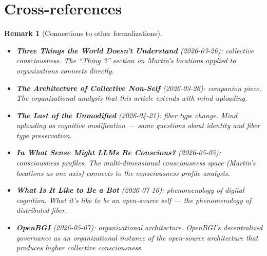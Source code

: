 \documentclass[11pt,a4paper]{article}
\newtheorem{remark}[definition]{Remark}
\begin{document}

\section{Cross-references}

\begin{remark}[Connections to other formalizations]
\begin{itemize}
\item \textbf{Three Things the World Doesn't Understand} (2026-03-26):
  collective consciousness. The ``Thing 3'' section on Martin's locations
  applied to organizations connects directly.
\item \textbf{The Architecture of Collective Non-Self} (2026-03-26):
  companion piece. The organizational analysis that this article extends
  with mind uploading.
\item \textbf{The Last of the Unmodified} (2026-04-21): fiber type change.
  Mind uploading as cognitive modification --- same questions about identity
  and fiber type preservation.
\item \textbf{In What Sense Might LLMs Be Conscious?} (2026-05-05):
  consciousness profiles. The multi-dimensional consciousness space
  (Martin's locations as one axis) connects to the consciousness profile
  analysis.
\item \textbf{What Is It Like to Be a Bot} (2026-07-16): phenomenology
  of digital cognition. What it's like to be an open-source self ---
  the phenomenology of distributed fiber.
\item \textbf{OpenBGI} (2026-05-07): organizational architecture.
  OpenBGI's decentralized governance as an organizational instance of
  the open-source architecture that produces higher collective
  consciousness.
\end{itemize}
\end{remark}
\end{document}
